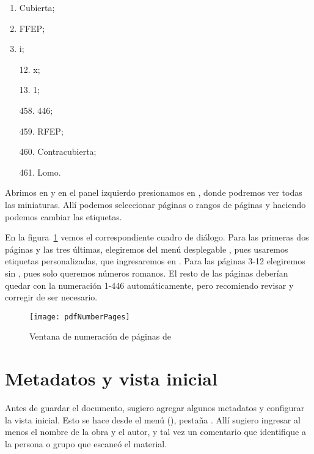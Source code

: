 \documentclass[%
	a5paper,
	10pt,
	twoside,
	openright,
	final,
]{memoir}
\begin{document}
{	\begin{multicols}{2}
		\begin{enumerate}[noitemsep]
			\item Cubierta;
			\item FFEP;%
			\item i;
			\item[] \raisebox{.2em}{\ldots}
			\item[12.] x;
			\item[13.] 1;
			\item[] \raisebox{.2em}{\ldots}
			\item[458.] 446;
			\item[459.] RFEP;
			\item[460.] Contracubierta;
			\item[461.] Lomo.
		\end{enumerate}
	\end{multicols}

	Abrimos  en \acrobat y en el panel izquierdo presionamos en , donde podremos ver todas las miniaturas. Allí podemos seleccionar páginas o rangos de páginas y haciendo  podemos cambiar las etiquetas.

	En la figura~\ref{fig:pdfNumberPages} vemos el correspondiente cuadro de diálogo. Para las primeras dos páginas y las tres últimas, elegiremos  del menú desplegable , pues usaremos etiquetas personalizadas, que ingresaremos en . Para las páginas 3-12 elegiremos  sin , pues solo queremos números romanos. El resto de las páginas deberían quedar con la numeración 1-446 automáticamente, pero recomiendo revisar y corregir de ser necesario.

	\begin{figure}
		\texttt{[image: pdfNumberPages]}
		\caption{Ventana de numeración de páginas de \acrobat\label{fig:pdfNumberPages}}
	\end{figure}

	\section{Metadatos y vista inicial} Antes de guardar el documento, sugiero agregar algunos metadatos y configurar la vista inicial. Esto se hace desde el menú  (), pestaña . Allí sugiero ingresar al menos el nombre de la obra y el autor, y tal vez un comentario que identifique a la persona o grupo que escaneó el material.

}
\end{document}
